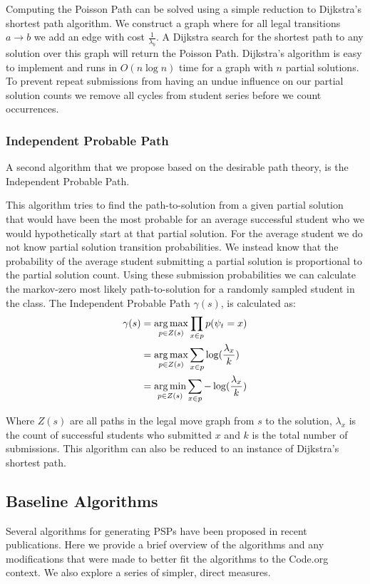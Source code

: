 Computing the Poisson Path can be solved using a simple reduction to Dijkstra's shortest path algorithm. We construct a graph where for all legal transitions $a \rightarrow b$ we add an edge with cost $\frac{1}{\lambda_b}$. A Dijkstra search for the shortest path to any solution over this graph will return the Poisson Path. Dijkstra's algorithm is easy to implement and runs in $O(n\log n)$ time for a graph with $n$ partial solutions. To prevent repeat submissions from having an undue influence on our partial solution counts we remove all cycles from student series before we count occurrences.


\subsubsection{Independent Probable Path}
A second algorithm that we propose based on the desirable path theory, is the Independent Probable Path. 

This algorithm tries to find the path-to-solution from a given partial solution that would have been the most probable for an average successful student who we would hypothetically start at that partial solution. For the average student we do not know partial solution transition probabilities. We instead know that the probability of the average student submitting a partial solution is proportional to the partial solution count. Using these submission probabilities we can calculate the markov-zero most likely path-to-solution for a randomly sampled student in the class. The Independent Probable Path $\gamma(s)$, is calculated as:
\begin{align*}
\gamma(s)&=\operatorname*{arg\,max}_{p \in Z(s)}{\prod_{x \in p}{p(\psi_t = x)}} \\
         &=\operatorname*{arg\,max}_{p \in Z(s)}{\sum_{x \in p}{\log(\frac{\lambda_x}{k})}}\\
         &=\operatorname*{arg\,min}_{p \in Z(s)}{\sum_{x \in p}{-\log(\frac{\lambda_x}{k})}}
\end{align*} 


Where $Z(s)$ are all paths in the legal move graph from $s$ to the solution, $\lambda_x$ is the count of successful students who submitted $x$ and $k$ is the total number of submissions. This algorithm can also be reduced to an instance of Dijkstra's shortest path. 

\subsection{Baseline Algorithms}
Several algorithms for generating PSPs have been proposed in recent publications. Here we provide a brief overview of the algorithms and any modifications that were made to better fit the algorithms to the Code.org context. We also explore a series of simpler, direct measures. 

